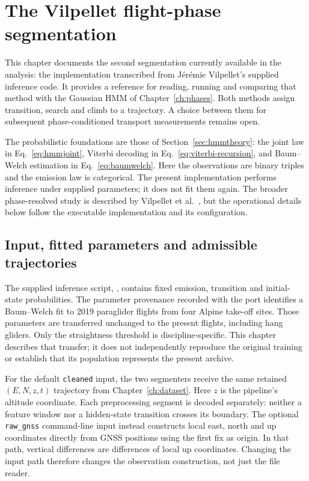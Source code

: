 \chapter{The Vilpellet flight-phase segmentation}
\label{ch:vilpellet}

This chapter documents the second segmentation currently available in the analysis:
the implementation transcribed from J\'er\'emie Vilpellet's supplied inference code.
It provides a reference for reading, running and comparing that method with the
Gaussian HMM of Chapter~\ref{ch:phases}. Both methods assign transition, search and
climb to a trajectory. A choice between them for subsequent phase-conditioned
transport measurements remains open.

The probabilistic foundations are those of Section~\ref{sec:hmmtheory}: the joint law
in Eq.~\eqref{eq:hmmjoint}, Viterbi decoding in Eq.~\eqref{eq:viterbi-recursion}, and
Baum--Welch estimation in Eq.~\eqref{eq:baumwelch}. Here the observations are binary
triples and the emission law is categorical. The present implementation performs
inference under supplied parameters; it does not fit them again. The broader
phase-resolved study is described by Vilpellet et al.~\cite{vilpellet2026}, but the
operational details below follow the executable implementation and its configuration.

\section{Input, fitted parameters and admissible trajectories}
\label{sec:vilpellet-input}
The supplied inference script, , contains fixed
emission, transition and initial-state probabilities. The parameter provenance
recorded with the port identifies a Baum--Welch fit to 2019 paraglider flights from
four Alpine take-off sites. Those parameters are transferred unchanged to the present
flights, including hang gliders. Only the straightness threshold is discipline-specific.
This chapter describes that transfer; it does not independently reproduce the original
training or establish that its population represents the present archive.

For the default \texttt{cleaned} input, the two segmenters receive the same retained
$(E,N,z,t)$ trajectory from Chapter~\ref{ch:dataset}. Here $z$ is the pipeline's
altitude coordinate. Each preprocessing segment is decoded separately: neither a
feature window nor a hidden-state transition crosses its boundary. The optional
\texttt{raw\_gnss} command-line input instead constructs local east, north and up
coordinates directly from GNSS positions using the first fix as origin. In that
path, vertical differences are differences of local up coordinates. Changing the
input path therefore changes the observation construction, not just the file reader.

